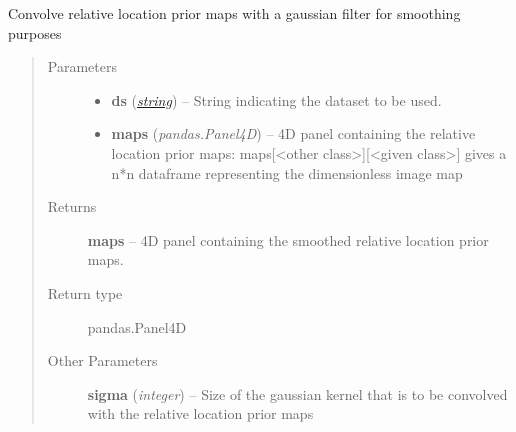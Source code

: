 \documentclass[letterpaper,10pt,english]{sphinxmanual}
\begin{document}
\begin{fulllineitems}
\label{flamingo/classification/index:flamingo.classification.features.relativelocation.smooth_maps}
Convolve relative location prior maps with a gaussian filter for smoothing purposes
\begin{quote}\begin{description}
\item[{Parameters}] \leavevmode\begin{itemize}
\item {} 
\textbf{ds} (\href{http://docs.python.org/library/string.html\#module-string}{\emph{string}}) -- String indicating the dataset to be used.

\item {} 
\textbf{maps} (\emph{pandas.Panel4D}) -- 4D panel containing the relative location prior maps: maps{[}\textless{}other class\textgreater{}{]}{[}\textless{}given class\textgreater{}{]}
gives a n*n dataframe representing the dimensionless image map

\end{itemize}

\item[{Returns}] \leavevmode
\textbf{maps} --
4D panel containing the smoothed relative location prior maps.

\item[{Return type}] \leavevmode
pandas.Panel4D

\item[{Other Parameters}] \leavevmode
\textbf{sigma} (\emph{integer}) --
Size of the gaussian kernel that is to be convolved with the relative location prior maps

\end{description}\end{quote}

\end{fulllineitems}

\end{document}
